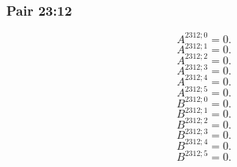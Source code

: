 \documentclass[11pt,a4paper]{article}
\begin{document}
\subsubsection{Pair 23:12}
\begin{equation}
A^{2312;0}=0.
\label{eq:cat-map-438}
\end{equation}
\begin{equation}
A^{2312;1}=0.
\label{eq:cat-map-439}
\end{equation}
\begin{equation}
A^{2312;2}=0.
\label{eq:cat-map-440}
\end{equation}
\begin{equation}
A^{2312;3}=0.
\label{eq:cat-map-441}
\end{equation}
\begin{equation}
A^{2312;4}=0.
\label{eq:cat-map-442}
\end{equation}
\begin{equation}
A^{2312;5}=0.
\label{eq:cat-map-443}
\end{equation}
\begin{equation}
B^{2312;0}=0.
\label{eq:cat-map-444}
\end{equation}
\begin{equation}
B^{2312;1}=0.
\label{eq:cat-map-445}
\end{equation}
\begin{equation}
B^{2312;2}=0.
\label{eq:cat-map-446}
\end{equation}
\begin{equation}
B^{2312;3}=0.
\label{eq:cat-map-447}
\end{equation}
\begin{equation}
B^{2312;4}=0.
\label{eq:cat-map-448}
\end{equation}
\begin{equation}
B^{2312;5}=0.
\label{eq:cat-map-449}
\end{equation}
\end{document}
